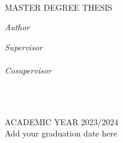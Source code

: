\documentclass[
11pt, %
english, %
singlespacing, %
headsepline, %
]{MastersDoctoralThesis} %
\theoremstyle{plain}
\theoremstyle{definition}
\theoremstyle{remark}
\begin{document}
\begin{titlepage}
\begin{center}
		\HRule \\[2cm] %
		{\huge \bfseries \ttitle\par}\vspace{1cm} %
		

		{MASTER DEGREE THESIS}\vspace{1cm} %
		
		\begin{minipage}[t]{0.4\textwidth}
			\begin{flushleft} \large
				\emph{Author}\\
				\href{}{\authorname} %
			\end{flushleft}
		\end{minipage}
		\begin{minipage}[t]{0.4\textwidth}
			\begin{flushright} \large
				\emph{Supervisor} \\
				\href{}{\supname} \\ %
				\phantom{null}\newline 
				\emph{Cosupervisor} \\
				\href{}{\cosupname}
			\end{flushright}
		\end{minipage}\\[2cm]
		
		\vfill
		
		
		\vfill
		\HRule \\[1cm] %
		{\large ACADEMIC YEAR 2023/2024 \\ Add your graduation date here}\\[4cm] %
		
		\vfill
	\end{center}
\end{titlepage}

\cleardoublepage

\end{document}
